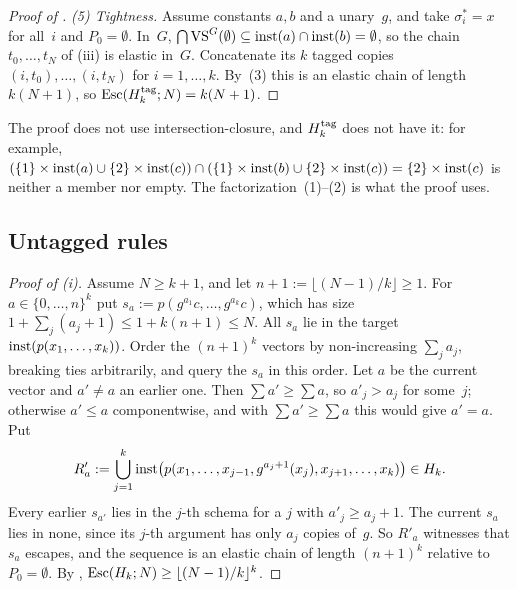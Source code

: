 \begin{proof}[Proof of ]
\emph{(5) Tightness.} Assume constants $a,b$ and a unary~$g$, and take $\sigma_i^*=x$ for all~$i$ and $P_0=\emptyset$. In~$G$, $\bigcap\mathrm{VS}^G(\emptyset)\subseteq\mathrm{inst}(a)\cap\mathrm{inst}(b)=\emptyset$, so the chain $t_0,\dots,t_N$ of (iii) is elastic in~$G$. Concatenate its $k$ tagged copies $(i,t_0),\dots,(i,t_N)$ for $i=1,\dots,k$. By~(3) this is an elastic chain of length $k(N+1)$, so $\mathrm{Esc}(H^{\mathrm{tag}}_{k};N)=k(N+1)$.
\end{proof}

The proof does not use intersection-closure, and $H^{\mathrm{tag}}_{k}$ does not have it: for example, $(\{1\}\times\mathrm{inst}(a)\cup\{2\}\times\mathrm{inst}(c))\cap(\{1\}\times\mathrm{inst}(b)\cup\{2\}\times\mathrm{inst}(c))=\{2\}\times\mathrm{inst}(c)$ is neither a member nor empty. The factorization~(1)--(2) is what the proof uses.

\subsection{Untagged rules}\label{app:caution:untagged}

\begin{proof}[Proof of (i)]
Assume $N\ge k+1$, and let $n+1:=\lfloor(N-1)/k\rfloor\ge1$. For $a\in\{0,\dots,n\}^k$ put $s_a:=p(g^{a_1}c,\dots,g^{a_k}c)$, which has size $1+\sum_j(a_j+1)\le1+k(n+1)\le N$. All $s_a$ lie in the target $\mathrm{inst}(p(x_1,\dots,x_k))$. Order the $(n+1)^k$ vectors by non-increasing $\sum_ja_j$, breaking ties arbitrarily, and query the $s_a$ in this order. Let $a$ be the current vector and $a'\neq a$ an earlier one. Then $\sum a'\ge\sum a$, so $a'_j>a_j$ for some~$j$; otherwise $a'\le a$ componentwise, and with $\sum a'\ge\sum a$ this would give $a'=a$. Put
\[
R'_a:=\bigcup_{j=1}^k\mathrm{inst}\big(p(x_1,\dots,x_{j-1},g^{a_j+1}(x_j),x_{j+1},\dots,x_k)\big)\in H_k .
\]
Every earlier $s_{a'}$ lies in the $j$-th schema for a $j$ with $a'_j\ge a_j+1$. The current $s_a$ lies in none, since its $j$-th argument has only $a_j$ copies of~$g$. So $R'_a$ witnesses that $s_a$ escapes, and the sequence is an elastic chain of length $(n+1)^k$ relative to $P_0=\emptyset$. By , $\mathrm{Esc}(H_k;N)\ge\lfloor(N-1)/k\rfloor^k$.
\end{proof}

